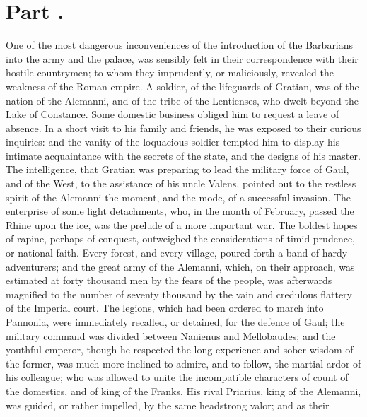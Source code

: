 
\section{Part \thesection.}

One of the most dangerous inconveniences of the introduction of
the Barbarians into the army and the palace, was sensibly felt in
their correspondence with their hostile countrymen; to whom they
imprudently, or maliciously, revealed the weakness of the Roman
empire. A soldier, of the lifeguards of Gratian, was of the
nation of the Alemanni, and of the tribe of the Lentienses, who
dwelt beyond the Lake of Constance. Some domestic business
obliged him to request a leave of absence. In a short visit to
his family and friends, he was exposed to their curious
inquiries: and the vanity of the loquacious soldier tempted him
to display his intimate acquaintance with the secrets of the
state, and the designs of his master. The intelligence, that
Gratian was preparing to lead the military force of Gaul, and of
the West, to the assistance of his uncle Valens, pointed out to
the restless spirit of the Alemanni the moment, and the mode, of
a successful invasion. The enterprise of some light detachments,
who, in the month of February, passed the Rhine upon the ice, was
the prelude of a more important war. The boldest hopes of rapine,
perhaps of conquest, outweighed the considerations of timid
prudence, or national faith. Every forest, and every village,
poured forth a band of hardy adventurers; and the great army of
the Alemanni, which, on their approach, was estimated at forty
thousand men by the fears of the people, was afterwards magnified
to the number of seventy thousand by the vain and credulous
flattery of the Imperial court. The legions, which had been
ordered to march into Pannonia, were immediately recalled, or
detained, for the defence of Gaul; the military command was
divided between Nanienus and Mellobaudes; and the youthful
emperor, though he respected the long experience and sober wisdom
of the former, was much more inclined to admire, and to follow,
the martial ardor of his colleague; who was allowed to unite the
incompatible characters of count of the domestics, and of king of
the Franks. His rival Priarius, king of the Alemanni, was guided,
or rather impelled, by the same headstrong valor; and as their
